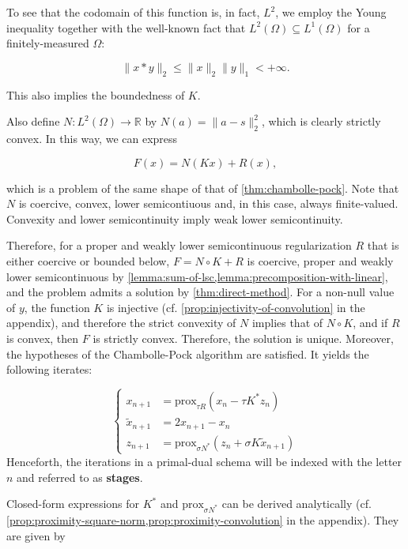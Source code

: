 \documentclass[twocolumn,twoside,a4paper,10pt]{IEEEtran}
\begin{document}
To see that the codomain of this function is, in fact, \(L^2\), we employ the Young inequality together with the well-known fact that \(L^2(\Omega)\subseteq L^1(\Omega)\) for a finitely-measured \(\Omega\):

\[
  \|x\ast y\|_2 \leq \|x\|_{2}\|y\|_{1} < +\infty
.\]

This also implies the boundedness of \(K\).

Also define \(N\colon L^2(\Omega)\to \mathbb{R}\) by \(N(a) = \|a - s\|_{2}^2\), which is clearly strictly convex. In this way, we can express

\[
  F(x) = N(Kx) + R(x),
\]

which is a problem of the same shape of that of \cref{thm:chambolle-pock}. Note that \(N\) is coercive, convex, lower semicontiuous and, in this case, always finite-valued. Convexity and lower semicontinuity imply weak lower semicontinuity.

Therefore, for a proper and weakly lower semicontinuous regularization \(R\) that is either coercive or bounded below, 
\(F=N\circ K + R\) is coercive, proper and weakly lower semicontinuous by \cref{lemma:sum-of-lsc,lemma:precomposition-with-linear}, and the problem admits a solution by \cref{thm:direct-method}. For a non-null value of \(y\), the function \(K\) is injective (cf. \cref{prop:injectivity-of-convolution} in the appendix), and therefore the strict convexity of \(N\) implies that of \(N\circ K\), and if \(R\) is convex, then \(F\) is strictly convex. Therefore, the solution is unique. Moreover, the hypotheses of the Chambolle-Pock algorithm are satisfied. It yields the following iterates:

\begin{equation}\label{eq:iterates}
  \left\{
  \begin{split}
    x_{n+1} & = \text{prox}_{\tau R}(x_n - \tau K^*z_n) \\
    \tilde{x}_{n+1} & = 2x_{n+1} - x_n \\
    z_{n+1} & = \text{prox}_{\sigma N^*}(z_n + \sigma K\tilde{x}_{n+1})
  \end{split}
  \right.
\end{equation}
Henceforth, the iterations in a primal-dual schema will be indexed with the letter \(n\) and referred to as \textbf{stages}.

Closed-form expressions for \(K^*\) and \(\text{prox}_{\sigma N^*}\) can be derived analytically (cf. \cref{prop:proximity-square-norm,prop:proximity-convolution} in the appendix). They are given by
\end{document}
